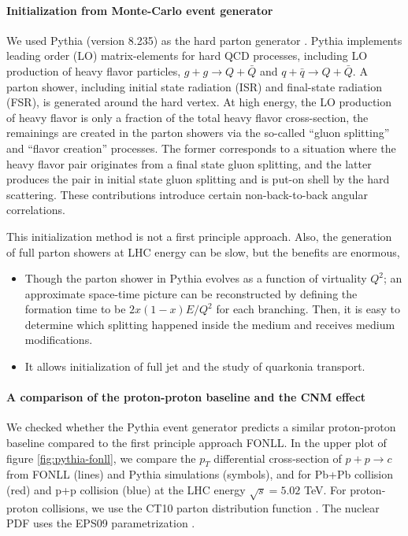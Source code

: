 \paragraph{Initialization from Monte-Carlo event generator}
We used Pythia (version 8.235) as the hard parton generator \cite{Sjostrand:2014zea, Sjostrand:2006za}.
Pythia implements leading order (LO) matrix-elements for hard QCD processes, including LO production of heavy flavor particles,
$g+g\rightarrow Q+\bar{Q}$ and $q+\bar{q}\rightarrow Q+\bar{Q}$.
A parton shower, including initial state radiation (ISR) and final-state radiation (FSR), is generated around the hard vertex.
At high energy, the LO production of heavy flavor is only a fraction of the total heavy flavor cross-section, the remainings are created in the parton showers via the so-called ``gluon splitting'' and ``flavor creation'' processes.
The former corresponds to a situation where the heavy flavor pair originates from a final state gluon splitting, and the latter produces the pair in initial state gluon splitting and is put-on shell by the hard scattering.
These contributions introduce certain non-back-to-back angular correlations.

This initialization method is not a first principle approach. 
Also, the generation of full parton showers at LHC energy can be slow, but the benefits are enormous,
\begin{itemize}
\item Though the parton shower in Pythia evolves as a function of virtuality $Q^2$; an approximate space-time picture can be reconstructed by defining the formation time to be $2x(1-x)E/Q^2$ for each branching. Then, it is easy to determine which splitting happened inside the medium and receives medium modifications.
\item It allows initialization of full jet and the study of quarkonia transport.
\end{itemize}

\paragraph{A comparison of the proton-proton baseline and the CNM effect}
We checked whether the Pythia event generator predicts a similar proton-proton baseline compared to the first principle approach FONLL.
In the upper plot of figure \ref{fig:pythia-fonll}, we compare the $p_T$ differential cross-section of $p+p\rightarrow c$ from FONLL (lines) and Pythia simulations (symbols), and for Pb+Pb collision (red) and p+p collision (blue) at the LHC energy $\sqrt{s}=5.02$ TeV.
For proton-proton collisions, we use the CT10 parton distribution function \cite{Lai:2010vv}.
The nuclear PDF uses the EPS09 parametrization \cite{Eskola:2009uj}.

